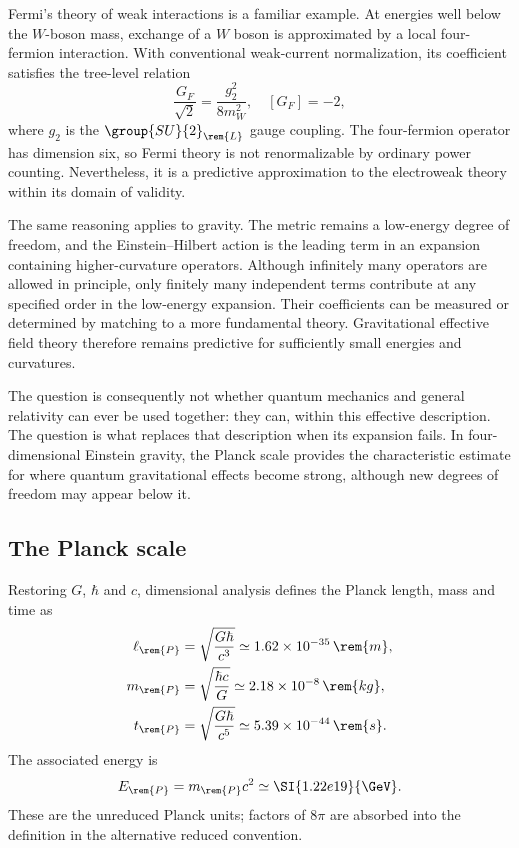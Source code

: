 Fermi's theory of weak interactions is a familiar example. At energies well below the $W$-boson mass, exchange of a $W$ boson is approximated by a local four-fermion interaction. With conventional weak-current normalization, its coefficient satisfies the tree-level relation
\begin{equation}
    \frac{G_F}{\sqrt{2}} = \frac{g_2^2}{8m_W^2},\quad [G_F] = -2,
\end{equation}
where $g_2$ is the $\group{SU}{2}_{\rem{L}}$ gauge coupling. The four-fermion operator has dimension six, so Fermi theory is not renormalizable by ordinary power counting. Nevertheless, it is a predictive approximation to the electroweak theory within its domain of validity.

The same reasoning applies to gravity. The metric remains a low-energy degree of freedom, and the Einstein--Hilbert action is the leading term in an expansion containing higher-curvature operators. Although infinitely many operators are allowed in principle, only finitely many independent terms contribute at any specified order in the low-energy expansion. Their coefficients can be measured or determined by matching to a more fundamental theory. Gravitational effective field theory therefore remains predictive for sufficiently small energies and curvatures.

The question is consequently not whether quantum mechanics and general relativity can ever be used together: they can, within this effective description. The question is what replaces that description when its expansion fails. In four-dimensional Einstein gravity, the Planck scale provides the characteristic estimate for where quantum gravitational effects become strong, although new degrees of freedom may appear below it.

\subsection{The Planck scale}
Restoring $G$, $\hbar$ and $c$, dimensional analysis defines the Planck length, mass and time as
\begin{equation}
    \begin{aligned}
        \ell_{\rem{P}} &= \sqrt{\frac{G\hbar}{c^3}} \simeq 1.62\times10^{-35}\,\rem{m}, \\
        m_{\rem{P}} &= \sqrt{\frac{\hbar c}{G}} \simeq 2.18\times10^{-8}\,\rem{kg}, \\
        t_{\rem{P}} &= \sqrt{\frac{G\hbar}{c^5}}\simeq 5.39\times10^{-44}\,\rem{s}.
    \end{aligned}
\end{equation}
The associated energy is
\begin{equation}
    E_{\rem{P}} = m_{\rem{P}}c^2 \simeq \SI{1.22e19}{\GeV}.
\end{equation}
These are the unreduced Planck units; factors of $8\pi$ are absorbed into the definition in the alternative reduced convention.

